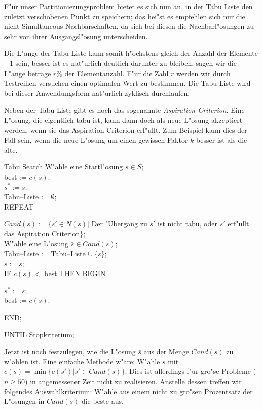 F"ur unser Partitionierungsproblem bietet es sich nun an, in der
Tabu Liste den zuletzt verschobenen Punkt zu speichern; das hei"st
es empfehlen sich nur die nicht 
Simul\-taneous Nachbarschaften, da sich bei diesen
die Nachbarl"osungen zu sehr von ihrer Ausgangsl"osung unterscheiden.

Die L"ange der Tabu Liste kann somit h"ochstens gleich der Anzahl der
Elemente $-1$ sein, besser ist es nat"urlich deutlich darunter zu 
bleiben, sagen wir die L"ange betrage $r\%$ der Elementanzahl.
F"ur die Zahl $r$ werden wir durch Testreihen versuchen einen 
optimalen Wert zu bestimmen. Die Tabu Liste wird bei dieser
Anwendungsform nat"urlich zyklisch durchlaufen.

Neben der Tabu Liste gibt es noch das sogenannte {\em Aspiration
Criterion}. Eine L"osung, die eigentlich tabu ist, kann dann doch als
neue L"osung akzeptiert werden, wenn sie das Aspiration Criterion
erf"ullt. Zum Beispiel kann dies der Fall sein, wenn  die neue L"osung
um einen gewissen Faktor $k$ besser ist als die alte.

\begin{algorithm}{Tabu Search}
W"ahle eine Startl"osung $s \in S$;\\
best := $c(s)$;\\
$s^* := s$;\\
Tabu--Liste := $\emptyset$;\\
{REPEAT}
\begin{Block}
	$Cand(s) := \{ s' \in N(s) | $ Der "Ubergang zu $s'$ ist nicht tabu,
	oder $s'$ erf"ullt das Aspiration Criterion$\}$;\\
	W"ahle eine L"osung $\bar s \in Cand(s)$;\\
	Tabu--Liste := Tabu--Liste $\cup\  \{ \bar s \}$;\\
	$s := \bar s$;\\
	IF $c(s) < $ best THEN BEGIN
	\begin{Block}
		$s^\ast := s$;\\
		best := $c(s)$;
	\end{Block}
	END;
\end{Block}
UNTIL Stopkriterium;
\end{algorithm}

Jetzt ist noch festzulegen, wie die L"osung $\bar s$ aus der Menge 
$Cand(s)$ zu w"ahlen ist. Eine einfache Methode w"are: W"ahle $\bar s$ mit
$c(\bar s) = \min \{ c(s') | s' \in Cand(s) \}$. Dies ist allerdings f"ur
gro"se Probleme ($n \geq 50$) in angemessener Zeit nicht zu realisieren.
Anstelle dessen treffen wir folgendes Auswahlkriterium: W"ahle aus einem
nicht zu gro"sen Prozentsatz der L"osungen in $Cand(s)$ die beste aus.

